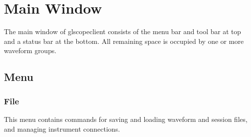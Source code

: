 \chapter{Main Window}

The main window of glscopeclient consists of the menu bar and tool bar at top and a status bar at the bottom. All
remaining space is occupied by one or more waveform groups.

\section{Menu}

\subsection{File}

This menu contains commands for saving and loading waveform and session files, and managing instrument connections.

